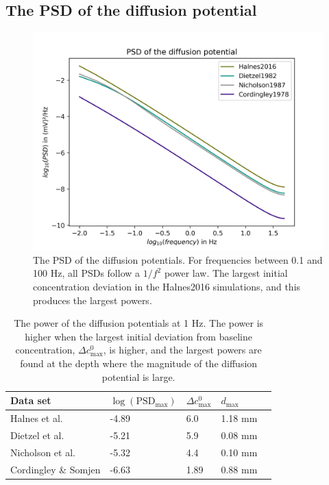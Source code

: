 \documentclass{uiophd}
\begin{document}
\subsection{The PSD of the diffusion potential}\label{calculated PSDs}

\begin{figure}
  \centering
  \includegraphics[width=\linewidth,height=0.6\textheight,keepaspectratio]{PSD.png}
  \caption{The PSD of the diffusion potentials. For frequencies between 0.1 and 100 Hz, all PSDs follow a $1/f^2$ power law. The largest initial concentration deviation in the Halnes2016 simulations, and this produces the largest powers.}
  \label{fig:PSD}
\end{figure}


\begin{table}[h!]
  \centering
  \caption{The power of the diffusion potentials at 1 Hz. The power is higher when the largest initial deviation from baseline concentration, $\Delta c^0_{\text{max}}$, is higher, and the largest powers are found at the depth where the magnitude of the diffusion potential is large.}
  \label{tab:psd_magnitude}
  \begin{tabular}{l||l|l|l|l}
Data set & $\log (\text{PSD}_{\text{max}})$ & $\Delta c^0_{\text{max}}$ & $d_{\text{max}}$ \\
\hline
Halnes et al. & -4.89 & 6.0  & 1.18 mm\\
Dietzel et al. & -5.21 & 5.9 & 0.08 mm \\
Nicholson et al.& -5.32 & 4.4 & 0.10 mm \\
Cordingley \& Somjen &-6.63 & 1.89 & 0.88 mm \\
 \end{tabular}
\end{table}
\end{document}
